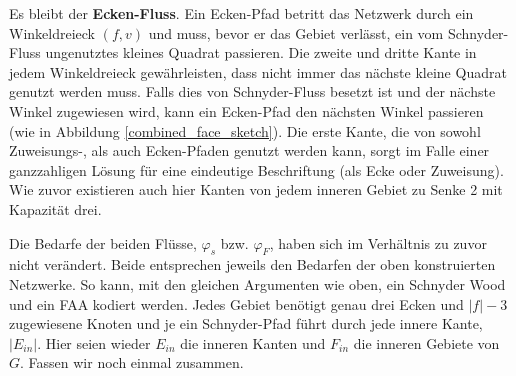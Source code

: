 Es bleibt der \textbf{Ecken-Fluss}. Ein Ecken-Pfad betritt das Netzwerk durch ein Winkeldreieck $(f,v)$ und muss, bevor er das Gebiet verlässt, ein vom Schnyder-Fluss ungenutztes kleines Quadrat passieren. Die zweite und dritte Kante in jedem Winkeldreieck gewährleisten, dass nicht immer das nächste kleine Quadrat genutzt werden muss. Falls dies von Schnyder-Fluss besetzt ist und der nächste Winkel zugewiesen wird, kann ein Ecken-Pfad den nächsten Winkel passieren (wie in Abbildung \ref{combined_face_sketch}). Die erste Kante, die von sowohl Zuweisungs-, als auch Ecken-Pfaden genutzt werden kann, sorgt im Falle einer ganzzahligen Lösung für eine eindeutige Beschriftung (als Ecke oder Zuweisung). Wie zuvor existieren auch hier Kanten von jedem inneren Gebiet zu Senke 2 mit Kapazität drei.

Die Bedarfe der beiden Flüsse, $\varphi_s$ bzw. $\varphi_F$, haben sich im Verhältnis zu zuvor nicht verändert. Beide entsprechen jeweils den Bedarfen der oben konstruierten Netzwerke. So kann, mit den gleichen Argumenten wie oben, ein Schnyder Wood und ein FAA kodiert werden. Jedes Gebiet benötigt genau drei Ecken und $|f|-3$ zugewiesene Knoten und je ein Schnyder-Pfad führt durch jede innere Kante, $|E_{in}|$. Hier seien wieder $E_{in}$ die inneren Kanten und $F_{in}$ die inneren Gebiete von $G$. Fassen wir noch einmal zusammen.

